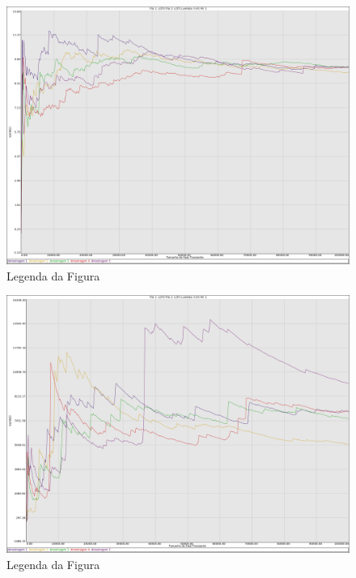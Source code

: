 \documentclass[a4paper,10pt]{article}
\begin{document}
\begin{figure}
	\caption{Legenda da Figura}
	\label{figTransienteLCFSfila1VarW}
	\includegraphics[scale = 0.2]{./graficos_transiente_1/LCFS/09.png}
\end{figure}

\begin{figure}
	\caption{Legenda da Figura}
	\label{figTransienteLCFSfila2VarW}
	\includegraphics[scale = 0.2]{./graficos_transiente_1/LCFS/10.png}
\end{figure}

\clearpage
\end{document}
